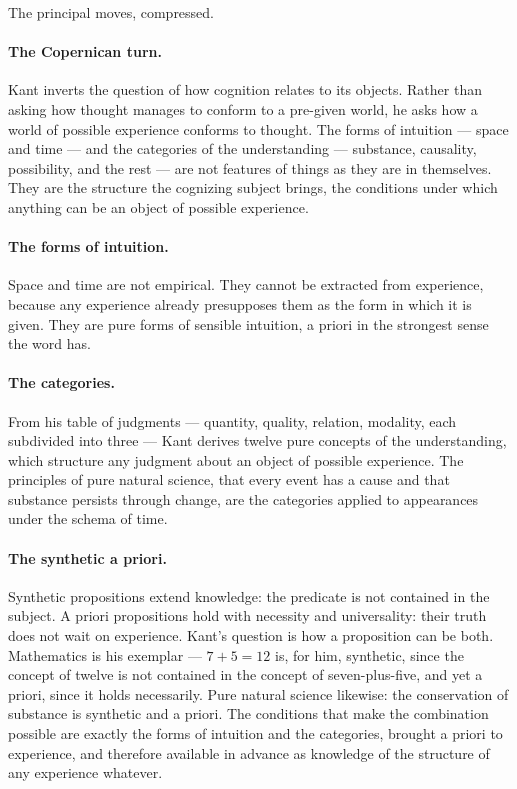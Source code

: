 The principal moves, compressed.

\paragraph{The Copernican turn.}
Kant inverts the question of how cognition relates to its objects.
Rather than asking how thought manages to conform to a pre-given
world, he asks how a world of possible experience conforms to
thought.
The forms of intuition --- space and time --- and the categories of
the understanding --- substance, causality, possibility, and the
rest --- are not features of things as they are in themselves.
They are the structure the cognizing subject brings, the conditions
under which anything can be an object of possible experience.

\paragraph{The forms of intuition.}
Space and time are not empirical.
They cannot be extracted from experience, because any experience
already presupposes them as the form in which it is given.
They are pure forms of sensible intuition, a priori in the
strongest sense the word has.

\paragraph{The categories.}
From his table of judgments --- quantity, quality, relation,
modality, each subdivided into three --- Kant derives twelve pure
concepts of the understanding, which structure any judgment about
an object of possible experience.
The principles of pure natural science, that every event has a
cause and that substance persists through change, are the
categories applied to appearances under the schema of time.

\paragraph{The synthetic a priori.}
Synthetic propositions extend knowledge: the predicate is not
contained in the subject.
A priori propositions hold with necessity and universality: their
truth does not wait on experience.
Kant's question is how a proposition can be both.
Mathematics is his exemplar --- $7+5=12$ is, for him, synthetic,
since the concept of twelve is not contained in the concept of
seven-plus-five, and yet a priori, since it holds necessarily.
Pure natural science likewise: the conservation of substance is
synthetic and a priori.
The conditions that make the combination possible are exactly the
forms of intuition and the categories, brought a priori to
experience, and therefore available in advance as knowledge of the
structure of any experience whatever.

